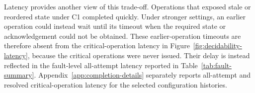 Latency provides another view of this trade-off. Operations that exposed stale
or reordered state under C1 completed quickly. Under stronger settings, an
earlier operation could instead wait until its timeout when the required state
or acknowledgement could not be obtained. These earlier-operation timeouts are
therefore absent from the critical-operation latency in
Figure~\ref{fig:decidability-latency}, because the critical operations were
never issued. Their delay is instead reflected in the fault-level all-attempt
latency reported in Table~\ref{tab:fault-summary}.
Appendix~\ref{app:completion-details} separately reports all-attempt and
resolved critical-operation latency for the selected configuration histories.

\FloatBarrier
